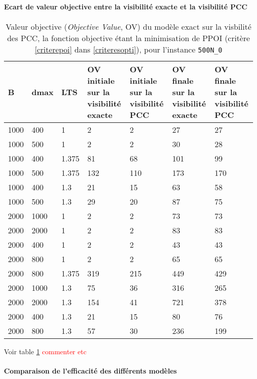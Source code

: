 \paragraph{Ecart de valeur objective entre la visibilité exacte et la visibilité PCC}

\begin{table}[!ht]
\centering
\caption{Valeur objective (\emph{Objective Value}, OV) du modèle exact sur la visbilité des PCC, la fonction objective étant la minimisation de PPOI (critère \ref{criterepoi} dans \ref{criteresopti}), pour l'instance \texttt{500N\_0}}
\vspace{0.5cm}
\begin{tabular}{|l|l|l|p{2cm}|p{2cm}|p{2cm}|p{2cm}|}
\hline
B & dmax & LTS & OV initiale sur la
visibilité exacte & OV initiale sur la
visibilité PCC & OV finale sur la visibilité exacte & OV finale sur la visibilité PCC \\
\hline
1000 & 400 & 1 & 2 & 2 & 27 & 27 \\
1000 & 500 & 1 & 2 & 2 & 30 & 28 \\
1000 & 400 & 1.375 & 81 & 68 & 101 & 99 \\
1000 & 500 & 1.375 & 132 & 110 & 173 & 170 \\
1000 & 400 & 1.3 & 21 & 15 & 63 & 58 \\
1000 & 500 & 1.3 & 29 & 20 & 87 & 75 \\
2000 & 1000 & 1 & 2 & 2 & 73 & 73 \\
2000 & 2000 & 1 & 2 & 2 & 83 & 83 \\
2000 & 400 & 1 & 2 & 2 & 43 & 43 \\
2000 & 800 & 1 & 2 & 2 & 65 & 65 \\
2000 & 800 & 1.375 & 319 & 215 & 449 & 429 \\
2000 & 1000 & 1.3 & 75 & 36 & 316 & 265 \\
2000 & 2000 & 1.3 & 154 & 41 & 721 & 378 \\
2000 & 400 & 1.3 & 21 & 15 & 80 & 76 \\
2000 & 800 & 1.3 & 57 & 30 & 236 & 199 \\
\hline
\end{tabular}
\label{tab:nbppoi}
\end{table}

Voir table \ref{tab:nbppoi}
\textcolor{red}{commenter etc}

\paragraph{Comparaison de l'efficacité des différents modèles}

